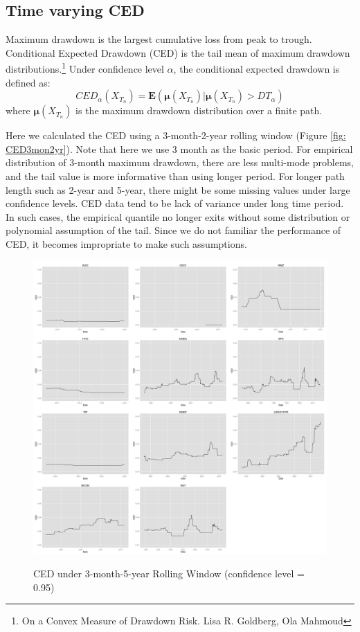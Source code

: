 \subsection{Time varying CED}

Maximum drawdown is the largest cumulative loss from peak to trough. Conditional Expected Drawdown (CED) is the tail mean of maximum drawdown distributions.\footnote{On a Convex Measure of Drawdown Risk. Lisa R. Goldberg, Ola Mahmoud} Under confidence level $\alpha$, the conditional expected drawdown is defined as:
\begin{equation}
CED_\alpha(X_{T_n}) = \textbf{E}(\mathbf{\mu}(X_{T_n})|\mathbf{\mu}(X_{T_n}) > DT_\alpha)
\end{equation}
where $\mathbf{\mu}(X_{T_n})$ is the maximum drawdown distribution over a finite path.

Here we calculated the CED using a 3-month-2-year rolling window (Figure \ref{fig: CED3mon2yr}).  Note that here we use 3 month as the basic period. For empirical distribution of 3-month maximum drawdown, there are less multi-mode problems, and the tail value is more informative than using longer period. For longer path length such as 2-year and 5-year, there might be some missing values under large confidence levels. CED data tend to be lack of variance under long time period. In such cases, the empirical quantile no longer exits without some distribution or polynomial assumption of the tail. Since we do not familiar the performance of CED, it becomes impropriate to make such assumptions. 

\iffalse

\begin{figure}[h]
\caption{CED under 3-month-5-year Rolling Window (confidence level = 0.95)} 
\centering 
\includegraphics[width=15cm]{../results/CED_3mon_5yr_95}
\label{fig: CED3mon5yr95}
\end{figure}

